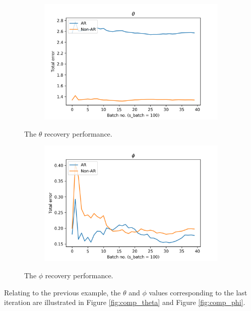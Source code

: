 \documentclass{mpaper}
\begin{document}
\begin{figure}[h]
  \centering
  \begin{subfigure}[b]{0.4\textwidth}
    \includegraphics[width=\linewidth]{performance-theta.png}
  \end{subfigure}%
  \caption{The $\theta$ recovery performance.}
  \label{fig:perf_theta}

  \begin{subfigure}[b]{0.4\textwidth}
    \includegraphics[width=\linewidth]{performance-phi.png}
  \end{subfigure}%
  \caption{The $\phi$ recovery performance.}
  \label{fig:perf_phi}
\end{figure}

\par Relating to the previous example, the $\theta$ and $\phi$ values corresponding to the last iteration are illustrated in Figure \ref{fig:comp_theta} and Figure \ref{fig:comp_phi}. 
\end{document}

